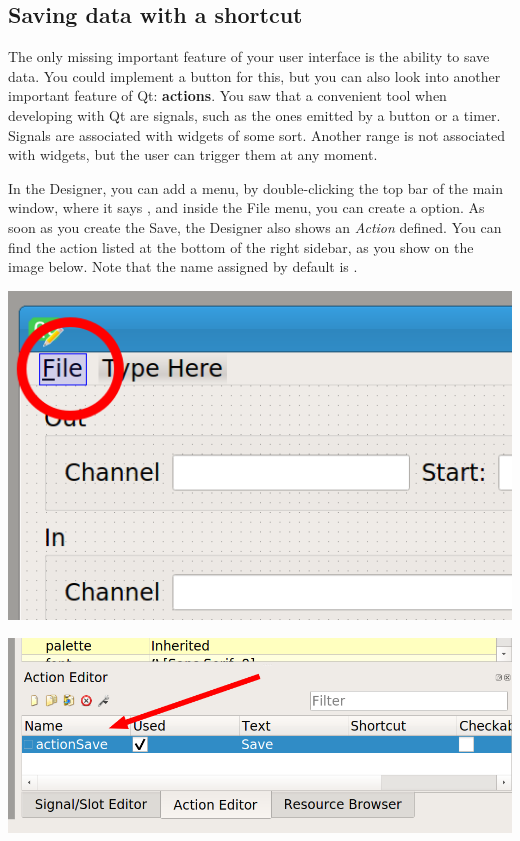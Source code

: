 \subsection{Saving data with a shortcut}\label{subsec:saving-data-with-a-shortcut}
The only missing important feature of your user interface is the ability to save data. You could implement a button for this, but you can also look into another important feature of Qt: \textbf{actions}. You saw that a convenient tool when developing with Qt are signals, such as the ones emitted by a button or a timer. Signals are associated with widgets of some sort. Another range is not associated with widgets, but the user can trigger them at any moment.

In the Designer, you can add a  menu, by double-clicking the top bar of the main window, where it says , and inside the File menu, you can create a  option. As soon as you create the Save, the Designer also shows an \emph{Action} defined. You can find the action listed at the bottom of the right sidebar, as you show on the image below. Note that the name assigned by default is .

\begin{minipage}{0.45\linewidth}
    \centering
    \includegraphics[width=\textwidth]{images/Chapter_09/13_menu_file.png}
\end{minipage}
\hspace{0.5cm}
\begin{minipage}{0.45\linewidth}
    \centering
    \includegraphics[width=\textwidth]{images/Chapter_09/13_action_save.png}
\end{minipage}

